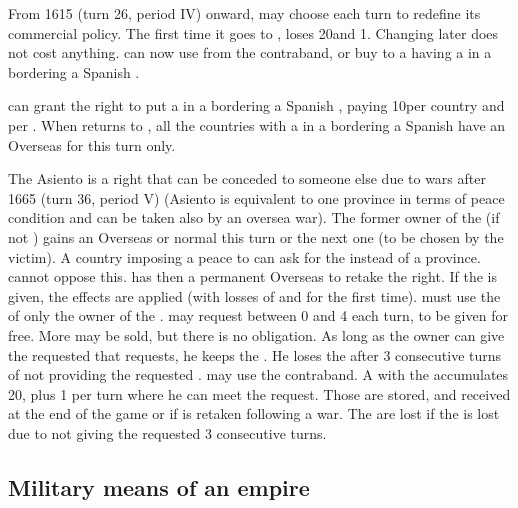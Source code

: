 \bparag From 1615 (turn 26, period IV) onward, \SPA may choose each
turn to redefine its commercial policy. The first time it goes to
, \SPA loses 20\VP and 1\STAB. Changing later
does not cost anything.
\bparag \SPA can now use  from the contraband, or buy
 to a \MAJ having a \TradeFLEET in a \STZ bordering a
Spanish \COL.

\bparag \SPA can grant the right to put a \TradeFLEET in a \STZ
bordering a Spanish \COL, paying 10\VP per country and per \STZ.
\bparag When \SPA returns to , all the
countries with a \TradeFLEET in a \STZ bordering a Spanish \COL have an
Overseas \CB for this turn only.

 The Asiento is a right that can
be conceded to someone else due to wars after 1665 (turn 36, period V)
(Asiento is equivalent to one province in terms of peace condition and
can be taken also by an oversea war). The former owner of the
 (if not \SPA) gains an Overseas or normal \CB this turn
or the next one (to be chosen by the victim).
\bparag A country imposing a peace to \SPA can ask for the
 instead of a province. \SPA cannot oppose this. \SPA has
then a permanent Overseas \CB to retake the  right.
\bparag If the  is given, the 
effects are applied (with losses of \VP and \STAB for the first time).
\bparag \SPA must use the  of only the owner of the
. \SPA may request between 0 and 4  each
turn, to be given for free. More may be sold, but there is no
obligation. As long as the  owner can give the requested
 that \SPA requests, he keeps the . He loses
the  after 3 consecutive turns of not providing the
requested .
\bparag \SPA may use the  contraband.
 A \MAJ with the  accumulates
20\VP, plus 1 per turn where he can meet the  request. Those
\VP are stored, and received at the end of the game or if
 is retaken following a war. The \VP are lost if the
 is lost due to not giving the requested  3
consecutive turns.



\subsection{Military means of an empire}



